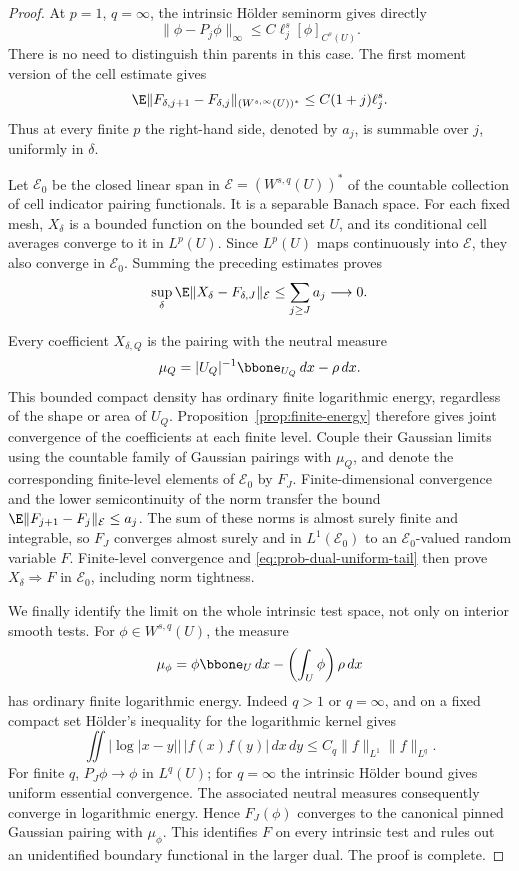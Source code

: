 \begin{proof}
At \(p=1\), \(q=\infty\), the intrinsic Hölder seminorm gives directly
\[
 \|\phi-P_j\phi\|_\infty
       \le C\ell_j^s[\phi]_{C^s(U)}.
\]
There is no need to distinguish thin parents in this case. The first
moment version of the cell estimate gives
\begin{equation}\label{eq:prob-dual-endpoint}
 \E\|F_{\delta,j+1}-F_{\delta,j}\|_{(W^{s,\infty}(U))^*}
       \le C(1+j)\ell_j^s.
\end{equation}
Thus at every finite \(p\) the right-hand side, denoted by \(a_j\),
is summable over \(j\), uniformly in \(\delta\).

Let \(\mathcal E_0\) be the closed linear span in
\(\mathcal E=(W^{s,q}(U))^*\) of the countable collection of cell
indicator pairing functionals. It is a separable Banach space.
For each fixed mesh, \(X_\delta\) is a bounded function on the bounded
set \(U\), and its conditional cell averages converge to it in
\(L^p(U)\). Since \(L^p(U)\) maps continuously into \(\mathcal E\),
they also converge in \(\mathcal E_0\). Summing the preceding
estimates proves
\begin{equation}\label{eq:prob-dual-uniform-tail}
 \sup_\delta\E\|X_\delta-F_{\delta,J}\|_{\mathcal E}
       \le\sum_{j\ge J}a_j\longrightarrow0.
\end{equation}

Every coefficient \(X_{\delta,Q}\) is the pairing with the neutral
measure
\[
 \mu_Q=|U_Q|^{-1}\bbone_{U_Q}\,dx-\rho\,dx.
\]
This bounded compact density has ordinary finite logarithmic energy,
regardless of the shape or area of \(U_Q\). Proposition~\ref{prop:finite-energy}
therefore gives joint convergence of the coefficients at each finite
level. Couple their Gaussian limits using the countable family of
Gaussian pairings with \(\mu_Q\), and denote the corresponding
finite-level elements of \(\mathcal E_0\) by \(F_J\).
Finite-dimensional convergence and the lower semicontinuity of the norm
transfer the bound
\(\E\|F_{j+1}-F_j\|_{\mathcal E}\le a_j\).
The sum of these norms is almost surely finite and integrable, so
\(F_J\) converges almost surely and in \(L^1(\mathcal E_0)\) to
an \(\mathcal E_0\)-valued random variable \(F\).
Finite-level convergence and \eqref{eq:prob-dual-uniform-tail}
then prove \(X_\delta\Rightarrow F\) in \(\mathcal E_0\), including
norm tightness.

We finally identify the limit on the whole intrinsic test space, not
only on interior smooth tests. For \(\phi\in W^{s,q}(U)\), the measure
\[
 \mu_\phi=\phi\bbone_U\,dx-\left(\int_U\phi\right)\rho\,dx
\]
has ordinary finite logarithmic energy. Indeed \(q>1\) or \(q=\infty\),
and on a fixed compact set Hölder's inequality for the logarithmic
kernel gives
\[
 \iint |\log|x-y||\,|f(x)f(y)|\,dx\,dy
       \le C_q\|f\|_{L^1}\|f\|_{L^q}.
\]
For finite \(q\), \(P_J\phi\to\phi\) in \(L^q(U)\); for \(q=\infty\)
the intrinsic Hölder bound gives uniform essential convergence.
The associated neutral measures consequently converge in logarithmic
energy. Hence \(F_J(\phi)\) converges to the canonical pinned Gaussian
pairing with \(\mu_\phi\). This identifies \(F\) on every intrinsic
test and rules out an unidentified boundary functional in the larger
dual. The proof is complete.
\end{proof}

